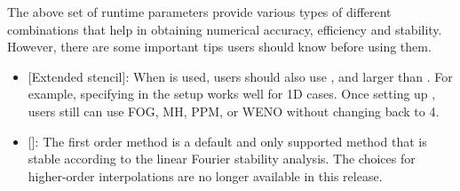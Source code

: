 The above set of runtime parameters provide various types of different combinations that help in obtaining
numerical accuracy, efficiency and stability. However, there are some important tips users should know before using them.
\begin{itemize}

\item {[Extended stencil]}: When  is used, users should also use , and  larger than . For example, specifying  in the setup works well for 1D cases. Once setting up , users still can use FOG, MH, PPM, or WENO without changing  back to 4.


\item {[]}: The first order method  is a default and only supported method that is stable according to the linear Fourier stability analysis. 
The choices for higher-order interpolations are no longer available in this release.


\end{itemize}
